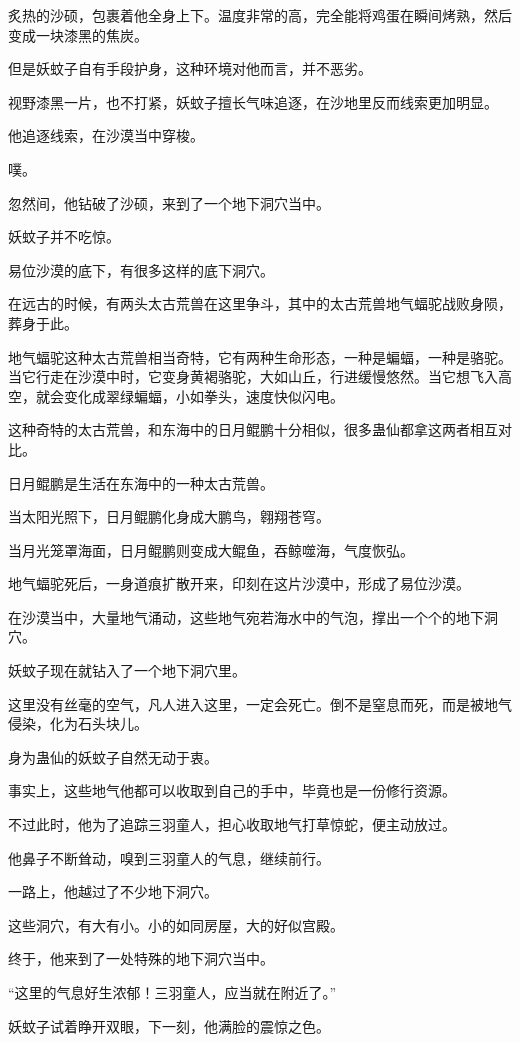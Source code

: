\begin{this_body}
炙热的沙硕，包裹着他全身上下。温度非常的高，完全能将鸡蛋在瞬间烤熟，然后变成一块漆黑的焦炭。

但是妖蚊子自有手段护身，这种环境对他而言，并不恶劣。

视野漆黑一片，也不打紧，妖蚊子擅长气味追逐，在沙地里反而线索更加明显。

他追逐线索，在沙漠当中穿梭。

噗。

忽然间，他钻破了沙硕，来到了一个地下洞穴当中。

妖蚊子并不吃惊。

易位沙漠的底下，有很多这样的底下洞穴。

在远古的时候，有两头太古荒兽在这里争斗，其中的太古荒兽地气蝠驼战败身陨，葬身于此。

地气蝠驼这种太古荒兽相当奇特，它有两种生命形态，一种是蝙蝠，一种是骆驼。当它行走在沙漠中时，它变身黄褐骆驼，大如山丘，行进缓慢悠然。当它想飞入高空，就会变化成翠绿蝙蝠，小如拳头，速度快似闪电。

这种奇特的太古荒兽，和东海中的日月鲲鹏十分相似，很多蛊仙都拿这两者相互对比。

日月鲲鹏是生活在东海中的一种太古荒兽。

当太阳光照下，日月鲲鹏化身成大鹏鸟，翱翔苍穹。

当月光笼罩海面，日月鲲鹏则变成大鲲鱼，吞鲸噬海，气度恢弘。

地气蝠驼死后，一身道痕扩散开来，印刻在这片沙漠中，形成了易位沙漠。

在沙漠当中，大量地气涌动，这些地气宛若海水中的气泡，撑出一个个的地下洞穴。

妖蚊子现在就钻入了一个地下洞穴里。

这里没有丝毫的空气，凡人进入这里，一定会死亡。倒不是窒息而死，而是被地气侵染，化为石头块儿。

身为蛊仙的妖蚊子自然无动于衷。

事实上，这些地气他都可以收取到自己的手中，毕竟也是一份修行资源。

不过此时，他为了追踪三羽童人，担心收取地气打草惊蛇，便主动放过。

他鼻子不断耸动，嗅到三羽童人的气息，继续前行。

一路上，他越过了不少地下洞穴。

这些洞穴，有大有小。小的如同房屋，大的好似宫殿。

终于，他来到了一处特殊的地下洞穴当中。

“这里的气息好生浓郁！三羽童人，应当就在附近了。”

妖蚊子试着睁开双眼，下一刻，他满脸的震惊之色。


\end{this_body}
